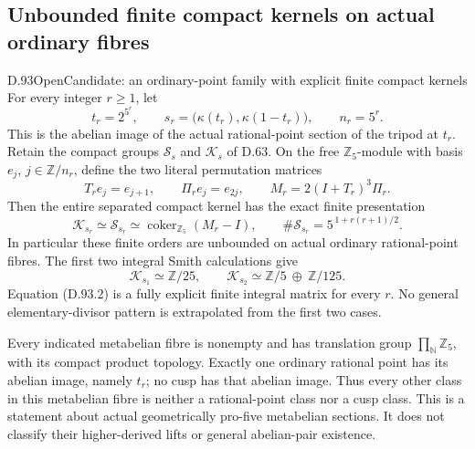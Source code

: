 \subsection{Unbounded finite compact kernels on actual ordinary fibres}

\begin{statement}{D.93}{Open}{Candidate: an ordinary-point family with explicit finite compact kernels}
For every integer \(r\ge1\), let
\[
 t_r=2^{5^r},\qquad
 s_r=\bigl(\kappa(t_r),\kappa(1-t_r)\bigr),
 \qquad n_r=5^r.                                      \tag{D.93.1}
\]
This is the abelian image of the actual rational-point section
of the tripod at \(t_r\). Retain the compact groups
\(\mathcal S_s\) and \(\mathcal K_s\) of D.63.
On the free \(\mathbb Z_5\)-module with basis
\(e_j\), \(j\in\mathbb Z/n_r\), define the two literal
permutation matrices
\[
 T_re_j=e_{j+1},\qquad
 \Pi_re_j=e_{2j},
 \qquad
 M_r=2(I+T_r)^3\Pi_r.                                 \tag{D.93.2}
\]
Then the entire separated compact kernel has the exact finite
presentation
\[
 \mathcal K_{s_r}\simeq\mathcal S_{s_r}
 \simeq
 \operatorname{coker}_{\mathbb Z_5}(M_r-I),
 \qquad
 \#\mathcal S_{s_r}=5^{\,1+r(r+1)/2}.                  \tag{D.93.3}
\]
In particular these finite orders are unbounded on actual
ordinary rational-point fibres. The first two integral Smith
calculations give
\[
 \mathcal K_{s_1}\simeq\mathbb Z/25,\qquad
 \mathcal K_{s_2}\simeq
        \mathbb Z/5\ \oplus\ \mathbb Z/125.             \tag{D.93.4}
\]
Equation (D.93.2) is a fully explicit finite integral matrix
for every \(r\). No general elementary-divisor pattern is
extrapolated from the first two cases.

Every indicated metabelian fibre is nonempty and has translation
group \(\prod_{\mathbb N}\mathbb Z_5\), with its compact product
topology. Exactly one ordinary rational point has its abelian
image, namely \(t_r\); no cusp has that abelian image. Thus every
other class in this metabelian fibre is neither a rational-point
class nor a cusp class. This is a statement about actual
geometrically pro-five metabelian sections. It does not classify
their higher-derived lifts or general abelian-pair existence.
\end{statement}

